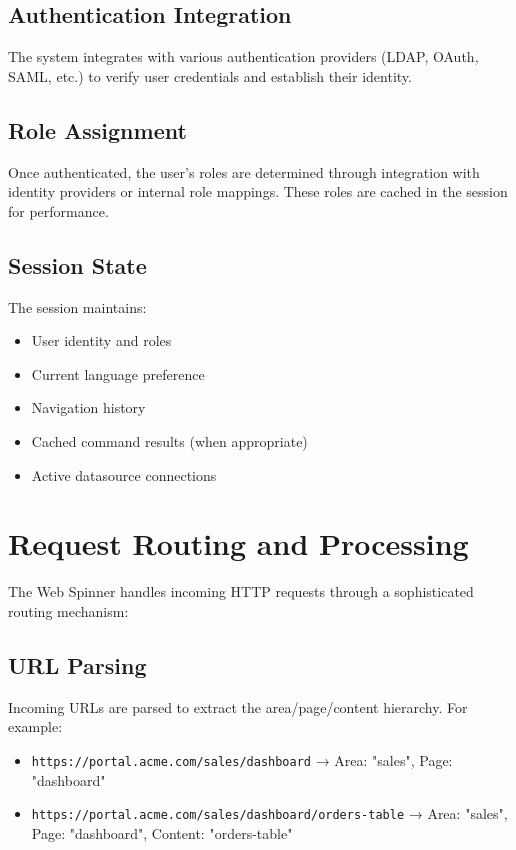 \subsection{Authentication Integration}

The system integrates with various authentication providers (LDAP, OAuth, SAML, etc.) to verify user credentials and establish their identity.

\subsection{Role Assignment}

Once authenticated, the user's roles are determined through integration with identity providers or internal role mappings. These roles are cached in the session for performance.

\subsection{Session State}

The session maintains:
\begin{itemize}
	\item User identity and roles
	\item Current language preference
	\item Navigation history
	\item Cached command results (when appropriate)
	\item Active datasource connections
\end{itemize}

\section{Request Routing and Processing}
\label{sec:request-routing}

The Web Spinner handles incoming HTTP requests through a sophisticated routing mechanism:

\subsection{URL Parsing}

Incoming URLs are parsed to extract the area/page/content hierarchy. For example:
\begin{itemize}
	\item \texttt{https://portal.acme.com/sales/dashboard} → Area: "sales", Page: "dashboard"
	\item \texttt{https://portal.acme.com/sales/dashboard/orders-table} → Area: "sales", Page: "dashboard", Content: "orders-table"
\end{itemize}


